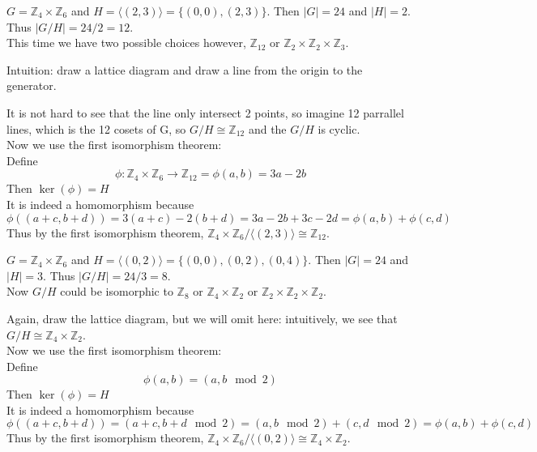\begin{eg}
    $G = \mathbb{Z}_4 \times \mathbb{Z}_6$ and $H = \langle (2, 3) \rangle = \{(0, 0), (2, 3)\}$. Then $|G| = 24$ and $|H| = 2$. Thus $|G/H| = 24/2 = 12$.\\
    This time we have two possible choices however, $\mathbb{Z}_{12}$ or $\mathbb{Z}_2 \times \mathbb{Z}_2 \times \mathbb{Z}_3$.\\
\end{eg}
\begin{answer}
    Intuition: draw a lattice diagram and draw a line from the origin to the generator.
\begin{center}
\end{center}
    It is not hard to see that the line only intersect 2 points, so imagine 12 parrallel lines, which is the 12 cosets of G, so $G/H \cong \mathbb{Z}_{12}$ and the $G/H$ is cyclic.\\
    Now we use the first isomorphism theorem:\\
    Define \[\phi: \mathbb{Z}_4 \times \mathbb{Z}_6 \to \mathbb{Z}_{12} = \phi(a, b) = 3a - 2b\] 
    Then $\ker(\phi) = H$\\
    It is indeed a homomorphism because 
    \[\phi((a+c, b+d)) = 3(a+c) - 2(b+d) = 3a - 2b + 3c - 2d = \phi(a, b) + \phi(c, d)\]
    Thus by the first isomorphism theorem, $\mathbb{Z}_4 \times \mathbb{Z}_6 / \langle (2, 3) \rangle \cong \mathbb{Z}_{12}$.
\end{answer}

\begin{eg}
    $G = \mathbb{Z}_4 \times \mathbb{Z}_6$ and $H = \langle (0, 2) \rangle = \{(0, 0), (0, 2), (0, 4)\}$. Then $|G| = 24$ and $|H| = 3$. Thus $|G/H| = 24/3 = 8$.\\ 
    Now $G/H$ could be isomorphic to $\mathbb{Z}_8$ or $\mathbb{Z}_4 \times \mathbb{Z}_2$ or $\mathbb{Z}_2 \times \mathbb{Z}_2 \times \mathbb{Z}_2$.\\
\end{eg}
\begin{answer}
    Again, draw the lattice diagram, but we will omit here: intuitively, we see that $G/H \cong \mathbb{Z}_4 \times \mathbb{Z}_2$.\\
    Now we use the first isomorphism theorem:\\
    Define \[\phi(a, b) = (a, b\mod 2)\] 
    Then $\ker(\phi) = H$\\
    It is indeed a homomorphism because
    \[\phi((a+c, b+d)) = (a+c, b+d \mod 2) = (a, b \mod 2) + (c, d \mod 2) = \phi(a, b) + \phi(c, d)\]
    Thus by the first isomorphism theorem, $\mathbb{Z}_4 \times \mathbb{Z}_6 / \langle (0, 2) \rangle \cong \mathbb{Z}_4 \times \mathbb{Z}_2$.
\end{answer}